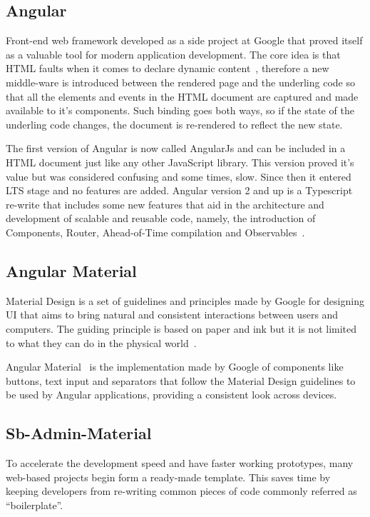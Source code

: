 \subsection{Angular}
Front-end web framework developed as a side project at Google that proved itself as a valuable tool for modern application development. The core idea is that \gls{HTML} faults when it comes to declare dynamic content~\cite{angularjs}, therefore a new middle-ware is introduced between the rendered page and the underling code so that all the elements and events in the \gls{HTML} document are captured and made available to it's components. Such binding goes both ways, so if the state of the underling code changes, the document is re-rendered to reflect the new state.

The first version of Angular is now called AngularJs and can be included in a \gls{HTML} document just like any other JavaScript library. This version proved it's value but was considered confusing and some times, slow. Since then it entered \gls{LTS} stage and no features are added. Angular version 2 and up is a Typescript re-write that includes some new features that aid in the architecture and development of scalable and reusable code, namely, the introduction of Components, Router, Ahead-of-Time compilation and Observables~\cite{angular}.


\subsection{Angular Material}
Material Design is a set of guidelines and principles made by Google for designing \gls{UI} that aims to bring natural and consistent interactions between users and computers. The guiding principle is based on paper and ink but it is not limited to what they can do in the physical world~\cite{materialdesign}.

Angular Material~\cite{angularmaterial} is the implementation made by Google of components like buttons, text input and separators that follow the Material Design guidelines to be used by Angular applications, providing a consistent look across devices.

\subsection{Sb-Admin-Material}
To accelerate the development speed and have faster working prototypes, many web-based projects begin form a ready-made template. This saves time by keeping developers from re-writing common pieces of code commonly referred as ``boilerplate''.

